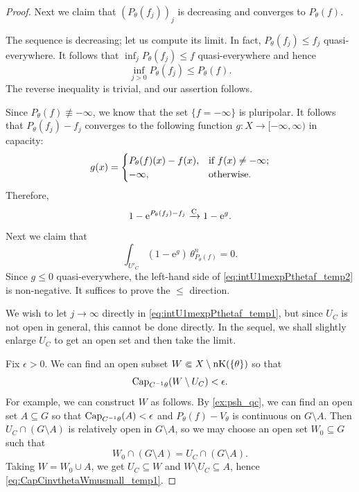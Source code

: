 \begin{proof}
    Next we claim that $(P_{\theta}(f_j))_j$ is decreasing and converges to $P_{\theta}(f)$.

    The sequence is decreasing; let us compute its limit.
    In fact, $P_{\theta}(f_j)\leq f_j$ quasi-everywhere. It follows that $\inf_j P_{\theta}(f_j)\leq f$ quasi-everywhere and hence
    \[
    \inf_{j>0} P_{\theta}(f_j)\leq P_{\theta}(f).
    \]
    The reverse inequality is trivial, and our assertion follows.

    Since $P_{\theta}(f)\not\equiv -\infty$, we know that the set $\{f=-\infty\}$ is pluripolar. It follows that $P_{\theta}(f_j)-f_j$ converges to the following function $g\colon X\rightarrow [-\infty,\infty)$ in capacity:
    \[
    g(x)=\begin{cases}
        P_{\theta}(f)(x)-f(x),&\textup{if } f(x)\neq -\infty;\\
        -\infty,& \textup{otherwise}.
    \end{cases}
    \]
    Therefore,
    \[
    1-\mathrm{e}^{P_{\theta}(f_j)-f_j}\xrightarrow[]{\mathrm{C}} 1-\mathrm{e}^{g}.
    \]
    Next we claim that
     \begin{equation}\label{eq:intU1mexpPthetaf_temp2}
    \int_{U'_C} \left( 1-\mathrm{e}^{g} \right)\,\theta_{P_{\theta}(f)}^n=0.
    \end{equation}
    Since $g\leq 0$ quasi-everywhere, the left-hand side of \eqref{eq:intU1mexpPthetaf_temp2} is non-negative. It suffices to prove the $\leq$ direction.

    We wish to let $j\to\infty$ directly in \eqref{eq:intU1mexpPthetaf_temp1}, but since $U_C$ is not open in general, this cannot be done directly. In the sequel, we shall slightly enlarge $U_C$ to get an open set and then take the limit.

    Fix $\epsilon>0$. We can find an open subset $W\Subset X\setminus \operatorname{nK}(\{\theta\})$ so that
    \begin{equation}\label{eq:CapCinvthetaWmusmall_temp1}
    \operatorname{Cap}_{C^{-1}\theta}(W\setminus U_C)<\epsilon.
    \end{equation}
    For example, we can construct $W$ as follows. By \cref{ex:psh_qc}, we can find an open set $A\subseteq G$ so that $\operatorname{Cap}_{C^{-1}\theta}(A)<\epsilon$ and $P_{\theta}(f)-V_{\theta}$ is continuous on $G\setminus A$. Then $U_C\cap (G\setminus A)$ is relatively open in $G\setminus A$, so we may choose an open set $W_0\subseteq G$ such that
    \[
        W_0\cap (G\setminus A)=U_C\cap (G\setminus A).
    \]
    Taking $W=W_0\cup A$, we get $U_C\subseteq W$ and $W\setminus U_C\subseteq A$, hence \eqref{eq:CapCinvthetaWmusmall_temp1}.


\end{proof}
